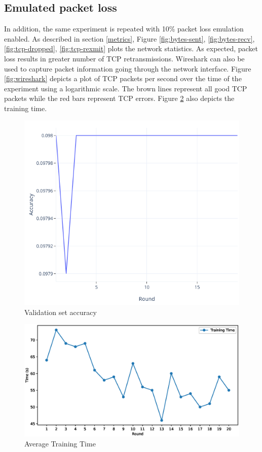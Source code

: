 \documentclass[12pt]{article}
\begin{document}
\subsection{Emulated packet loss}
In addition, the same experiment is repeated with 10\% packet loss emulation enabled. As described in section \ref{metrics}, Figure \ref{fig:bytes-sent}, \ref{fig:bytes-recv},
\ref{fig:tcp-dropped}, \ref{fig:tcp-rexmit} plots the network statistics. As expected, packet loss
results in greater number of TCP retransmissions. Wireshark\cite{wireshark} can also
be used to capture packet information going through the network interface. Figure
\ref{fig:wireshark} depicts a plot of TCP packets per second over the time of the experiment using a
logarithmic scale. The brown lines represent all good TCP packets while the red bars represent TCP
errors. Figure \ref{fig:training_time} also depicts the training time.

\begin{figure}
  \includegraphics[width=\linewidth]{accuracy}
  \caption{Validation set accuracy}
  \label{fig:accuracy}
\end{figure}

\begin{figure}
  \includegraphics[width=\linewidth]{avg-training}
  \caption{Average Training Time}
  \label{fig:training_time}
\end{figure}
\end{document}
